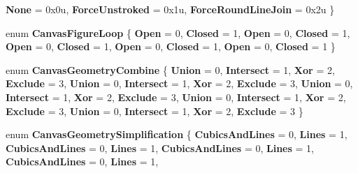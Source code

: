 \begin{DoxyCompactItemize}
\newline
{\bfseries None} = 0x0u, 
{\bfseries Force\+Unstroked} = 0x1u, 
{\bfseries Force\+Round\+Line\+Join} = 0x2u
 \}
\item 
\mbox{\label{namespace_microsoft_1_1_graphics_1_1_canvas_1_1_geometry_a28bf1d65eb419d2a2015efc91bb9741c}} 
enum {\bfseries Canvas\+Figure\+Loop} \{ \newline
{\bfseries Open} = 0, 
{\bfseries Closed} = 1, 
{\bfseries Open} = 0, 
{\bfseries Closed} = 1, 
\newline
{\bfseries Open} = 0, 
{\bfseries Closed} = 1, 
{\bfseries Open} = 0, 
{\bfseries Closed} = 1, 
\newline
{\bfseries Open} = 0, 
{\bfseries Closed} = 1
 \}
\item 
\mbox{\label{namespace_microsoft_1_1_graphics_1_1_canvas_1_1_geometry_a8aee93f6169d213f64028a369522c8bb}} 
enum {\bfseries Canvas\+Geometry\+Combine} \{ \newline
{\bfseries Union} = 0, 
{\bfseries Intersect} = 1, 
{\bfseries Xor} = 2, 
{\bfseries Exclude} = 3, 
\newline
{\bfseries Union} = 0, 
{\bfseries Intersect} = 1, 
{\bfseries Xor} = 2, 
{\bfseries Exclude} = 3, 
\newline
{\bfseries Union} = 0, 
{\bfseries Intersect} = 1, 
{\bfseries Xor} = 2, 
{\bfseries Exclude} = 3, 
\newline
{\bfseries Union} = 0, 
{\bfseries Intersect} = 1, 
{\bfseries Xor} = 2, 
{\bfseries Exclude} = 3, 
\newline
{\bfseries Union} = 0, 
{\bfseries Intersect} = 1, 
{\bfseries Xor} = 2, 
{\bfseries Exclude} = 3
 \}
\item 
\mbox{\label{namespace_microsoft_1_1_graphics_1_1_canvas_1_1_geometry_a2ce59b66d6d8d5be54c22ba03d885c82}} 
enum {\bfseries Canvas\+Geometry\+Simplification} \{ \newline
{\bfseries Cubics\+And\+Lines} = 0, 
{\bfseries Lines} = 1, 
{\bfseries Cubics\+And\+Lines} = 0, 
{\bfseries Lines} = 1, 
\newline
{\bfseries Cubics\+And\+Lines} = 0, 
{\bfseries Lines} = 1, 
{\bfseries Cubics\+And\+Lines} = 0, 
{\bfseries Lines} = 1, 
\newline

\end{DoxyCompactItemize}
